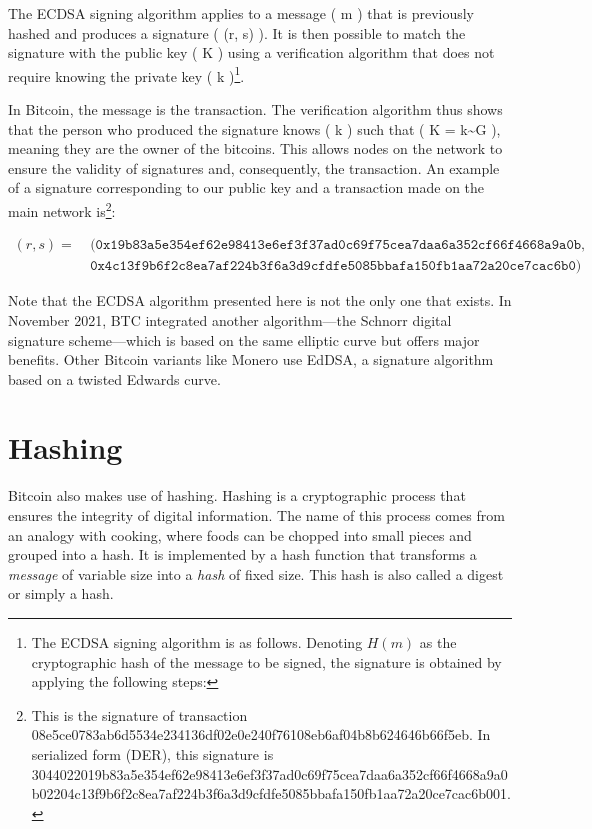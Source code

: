 \documentclass[
  a5paper,
  smalldemyvopaper,10pt,twoside,onecolumn,openright,extrafontsizes,hidelinks]{memoir}
\begin{document}
The ECDSA signing algorithm applies to a message ( m ) that is
previously hashed and produces a signature ( (r, s) ). It is then
possible to match the signature with the public key ( K ) using a
verification algorithm that does not require knowing the private key ( k
)\footnote{The ECDSA signing algorithm is as follows. Denoting \(H(m)\)
  as the cryptographic hash of the message to be signed, the signature
  is obtained by applying the following steps:}.

In Bitcoin, the message is the transaction. The verification algorithm
thus shows that the person who produced the signature knows ( k ) such
that ( K = k\textasciitilde G ), meaning they are the owner of the
bitcoins. This allows nodes on the network to ensure the validity of
signatures and, consequently, the transaction. An example of a signature
corresponding to our public key and a transaction made on the main
network is\footnote{This is the signature of transaction
  08e5ce0783ab6d5534e234136df02e0e240f76108eb6af04b8b624646b66f5eb. In
  serialized form (DER), this signature is
  3044022019b83a5e354ef62e98413e6ef3f37ad0c69f75cea7daa6a352cf66f4668a9a0b02204c13f9b6f2c8ea7af224b3f6a3d9cfdfe5085bbafa150fb1aa72a20ce7cac6b001.}:

\[\begin{aligned}
(r, s) = &~(\mathtt{0x19b83a5e354ef62e98413e6ef3f37ad0c69f75cea7daa6a352cf66f4668a9a0b}, \\
    &~\mathtt{0x4c13f9b6f2c8ea7af224b3f6a3d9cfdfe5085bbafa150fb1aa72a20ce7cac6b0})
\end{aligned}\]

Note that the ECDSA algorithm presented here is not the only one that
exists. In November 2021, BTC integrated another algorithm---the Schnorr
digital signature scheme---which is based on the same elliptic curve but
offers major benefits. Other Bitcoin variants like Monero use EdDSA, a
signature algorithm based on a twisted Edwards curve.

\section*{Hashing}\label{hashing}


Bitcoin also makes use of hashing. Hashing is a cryptographic process
that ensures the integrity of digital information. The name of this
process comes from an analogy with cooking, where foods can be chopped
into small pieces and grouped into a hash. It is implemented by a hash
function that transforms a \emph{message} of variable size into a
\emph{hash} of fixed size. This hash is also called a digest or simply a
hash.
\end{document}
